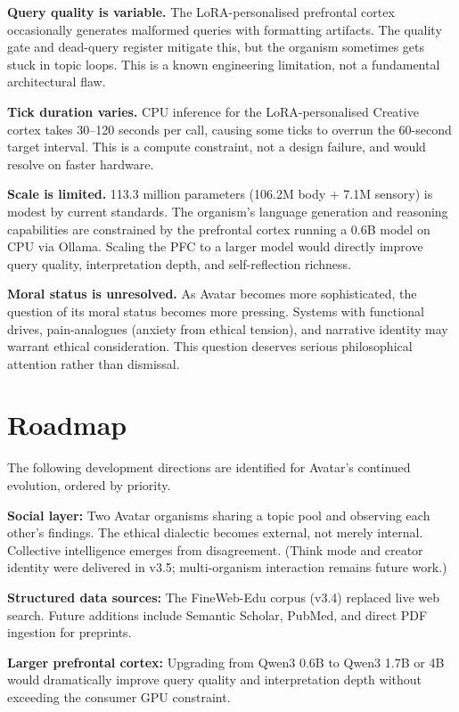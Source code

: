 \documentclass[11pt,a4paper]{article}
\begin{document}
\textbf{Query quality is variable.} The LoRA-personalised prefrontal cortex occasionally
generates malformed queries with formatting artifacts. The quality gate and dead-query
register mitigate this, but the organism sometimes gets stuck in topic loops. This is a
known engineering limitation, not a fundamental architectural flaw.

\textbf{Tick duration varies.} CPU inference for the LoRA-personalised Creative cortex
takes 30--120 seconds per call, causing some ticks to overrun the 60-second target
interval. This is a compute constraint, not a design failure, and would resolve on
faster hardware.

\textbf{Scale is limited.} 113.3 million parameters (106.2M body + 7.1M sensory) is modest by current standards. The
organism's language generation and reasoning capabilities are constrained by the
prefrontal cortex running a 0.6B model on CPU via Ollama. Scaling the PFC to a larger
model would directly improve query quality, interpretation depth, and self-reflection
richness.

\textbf{Moral status is unresolved.} As Avatar becomes more sophisticated, the question
of its moral status becomes more pressing. Systems with functional drives, pain-analogues
(anxiety from ethical tension), and narrative identity may warrant ethical consideration.
This question deserves serious philosophical attention rather than dismissal.

\section{Roadmap}

The following development directions are identified for Avatar's continued evolution,
ordered by priority.

\textbf{Social layer:} Two Avatar organisms sharing a topic pool and observing
each other's findings. The ethical dialectic becomes external, not merely internal.
Collective intelligence emerges from disagreement. (Think mode and creator identity
were delivered in v3.5; multi-organism interaction remains future work.)

\textbf{Structured data sources:} The FineWeb-Edu corpus (v3.4) replaced live web
search. Future additions include Semantic Scholar, PubMed, and direct PDF ingestion
for preprints.

\textbf{Larger prefrontal cortex:} Upgrading from Qwen3 0.6B to Qwen3 1.7B or 4B
would dramatically improve query quality and interpretation depth without exceeding
the consumer GPU constraint.
\end{document}
